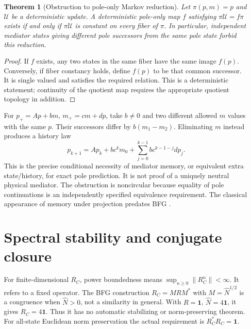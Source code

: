 \documentclass[11pt,letterpaper]{article}
\newcommand{\Id}{\mathbf 1}
\newtheorem{theorem}{Theorem}[section]
\theoremstyle{definition}
\numberwithin{equation}{section}
\begin{document}
\begin{theorem}[Obstruction to pole-only Markov reduction]\label{memory}
Let $\pi(p,m)=p$ and $\mathcal U$ be a deterministic update. A deterministic pole-only map $f$ satisfying $\pi\mathcal U=f\pi$ exists if and only if $\pi\mathcal U$ is constant on every fiber of $\pi$. In particular, independent mediator states giving different pole successors from the same pole state forbid this reduction.
\end{theorem}
\begin{proof}
If $f$ exists, any two states in the same fiber have the same image $f(p)$. Conversely, if fiber constancy holds, define $f(p)$ to be that common successor. It is single valued and satisfies the required relation. This is a deterministic statement; continuity of the quotient map requires the appropriate quotient topology in addition.
\end{proof}
For $p_+=Ap+bm$, $m_+=cm+dp$, take $b\ne0$ and two different allowed $m$ values with the same $p$. Their successors differ by $b(m_1-m_2)$. Eliminating $m$ instead produces a history law
\begin{equation}
p_{k+1}=Ap_k+bc^km_0+\sum_{j=0}^{k-1}bc^{k-1-j}dp_j.
\end{equation}
This is the precise conditional necessity of mediator memory, or equivalent extra state/history, for exact pole prediction. It is not proof of a uniquely neutral physical mediator. The obstruction is noncircular because equality of pole continuations is an independently specified equivalence requirement. The classical appearance of memory under projection predates BFG \cite{zwanzig}.

\section{Spectral stability and conjugate closure}
For finite-dimensional $R_C$, power boundedness means $\sup_{n\geq0}\|R_C^n\|<\infty$. It refers to a fixed operator. The BFG construction $R_C=M R M^*$ with $M=\widehat N^{1/2}$ \cite{conjugate} is a congruence when $\widehat N>0$, not a similarity in general. With $R=\Id$, $\widehat N=4\Id$, it gives $R_C=4\Id$. Thus it has no automatic stabilizing or norm-preserving theorem. For all-state Euclidean norm preservation the actual requirement is $R_C^*R_C=\Id$.
\end{document}
